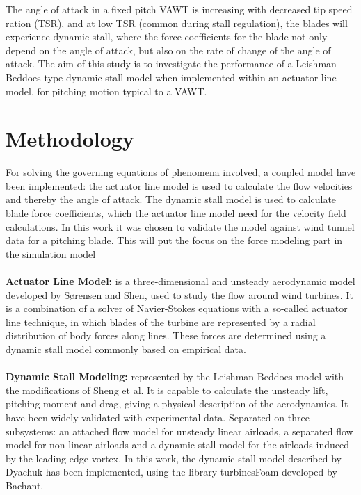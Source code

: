\documentclass[a4paper]{jpconf}
\begin{document}
The angle of attack in a fixed pitch VAWT is increasing with decreased tip speed
ration (TSR), and at low TSR (common during stall regulation), the blades will
experience dynamic stall, where the force coefficients for the blade not only
depend on the angle of attack, but also on the rate of change of the angle of
attack. The aim of this study is to investigate the performance of a
Leishman-Beddoes type dynamic stall model when implemented within an actuator
line model, for pitching motion typical to a VAWT.


\section{Methodology}
For solving the governing equations of phenomena involved, a coupled model have been implemented: the actuator line model is used to calculate the flow velocities and thereby the angle of attack. The dynamic stall model is used to calculate blade force coefficients, which the actuator line model need for the velocity field calculations. In this work it was chosen to validate the model against wind tunnel data for a pitching blade. This will put the focus on the force modeling part in the simulation model\\
\\
\textbf{Actuator Line Model:} is a three-dimensional and unsteady aerodynamic model developed by S{\o}rensen and Shen\cite{sorensen1999computation}, used to study the flow around wind turbines. It is a combination of a solver of Navier-Stokes equations with a so-called actuator line technique, in which blades of the turbine are represented by a radial distribution of body forces along lines. These forces are determined using a dynamic stall model commonly based on empirical data.\\
\\
\textbf{Dynamic Stall Modeling:} represented by the Leishman-Beddoes model\cite{leishman1986generalised} with the modifications of Sheng et al\cite{sheng2008modified}. It is capable to calculate the unsteady lift, pitching moment and drag, giving a physical description of the aerodynamics. It have been widely validated with experimental data\cite{leishman1989semi}. Separated on three subsystems: an attached flow model for unsteady linear airloads, a separated flow model for non-linear airloads and a dynamic stall model for the airloads induced by the leading edge vortex. In this work, the dynamic stall model described by Dyachuk\cite{dyachuk} has been implemented, using the library turbinesFoam developed by Bachant\cite{bachant2015simulating}.\\
\end{document}
